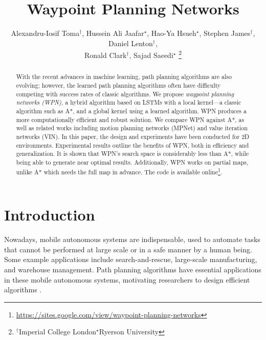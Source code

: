 \documentclass[journal, twocolumn]{IEEEtran}
\title{\LARGE Waypoint Planning Networks\vspace{-2 mm}}
\author{
\vspace{-0 mm}
Alexandru-Iosif Toma$^{\dagger}$, Hussein Ali Jaafar$^{\star}$, Hao-Ya Hsueh$^{\star}$, Stephen James$^{\dagger}$, Daniel Lenton$^{\dagger}$,\\
Ronald Clark$^{\dagger}$,  Sajad Saeedi$^{\star}$%
\vspace{-5 mm}
\thanks{$^{\dagger}$Imperial College London\quad\quad $^{\star}$Ryerson University}%
}
\begin{document}
\maketitle
\vspace{-2 mm}

\begin{abstract}

With the recent advances in machine learning, path planning algorithms are also evolving; however, the learned path planning algorithms often have difficulty competing with success rates of classic algorithms. We propose \emph{waypoint planning networks (WPN)}, a hybrid algorithm based on LSTMs with a local kernel---a classic algorithm such as A*, and a global kernel using a learned algorithm. 
%
WPN produces a more computationally efficient and robust solution. We compare WPN against A*, as well as related works including motion planning networks (MPNet) and value iteration networks (VIN). In this paper, the design and experiments have been conducted for 2D environments. 
%
Experimental results outline the benefits of WPN, both in efficiency and generalization. It is shown that WPN's search space is considerably less than A*, while being able to generate near optimal results. Additionally, WPN works on partial maps, unlike A* which needs the full map in advance. The code is available online\footnote{\href{https://sites.google.com/view/waypoint-planning-networks/home}{https://sites.google.com/view/waypoint-planning-networks}}.

\end{abstract}



\section{Introduction}
Nowadays, mobile autonomous systems are indispensable, used to automate tasks that cannot be performed at large scale or in a safe manner by a human being. Some example applications include search-and-rescue, large-scale manufacturing, and warehouse management. 
Path planning algorithms have essential applications in these mobile autonomous systems, motivating researchers to design efficient algorithms \cite{gonzalez2016review}.
\end{document}
